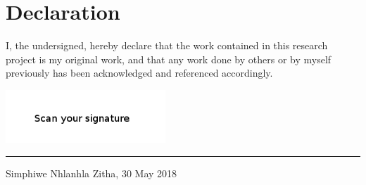 \section*{Declaration}
I, the undersigned, hereby declare that the work contained in this research project is my original work, and that any work done by others or by myself previously has been acknowledged and referenced accordingly.

\includegraphics[height=2cm]{images/signature.png} \newline \hrule
Simphiwe Nhlanhla Zitha, 30 May 2018

